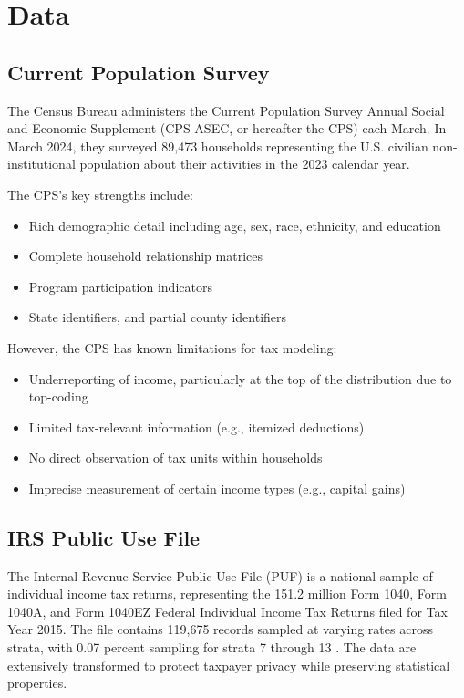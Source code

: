 \section{Data}\label{sec:data}

\subsection{Current Population Survey}

The Census Bureau administers the Current Population Survey Annual Social and Economic Supplement (CPS ASEC, or hereafter the CPS) each March. In March 2024, they surveyed 89,473 households representing the U.S. civilian non-institutional population about their activities in the 2023 calendar year.

The CPS's key strengths include:
\begin{itemize}
    \item Rich demographic detail including age, sex, race, ethnicity, and education
    \item Complete household relationship matrices
    \item Program participation indicators
    \item State identifiers, and partial county identifiers
\end{itemize}

However, the CPS has known limitations for tax modeling:
\begin{itemize}
    \item Underreporting of income, particularly at the top of the distribution due to top-coding
    \item Limited tax-relevant information (e.g., itemized deductions)
    \item No direct observation of tax units within households
    \item Imprecise measurement of certain income types (e.g., capital gains)
\end{itemize}

\subsection{IRS Public Use File}

The Internal Revenue Service Public Use File (PUF) is a national sample of individual income tax returns, representing the 151.2 million Form 1040, Form 1040A, and Form 1040EZ Federal Individual Income Tax Returns filed for Tax Year 2015. The file contains 119,675 records sampled at varying rates across strata, with 0.07 percent sampling for strata 7 through 13 \citep{bryant2023b}. The data are extensively transformed to protect taxpayer privacy while preserving statistical properties.

